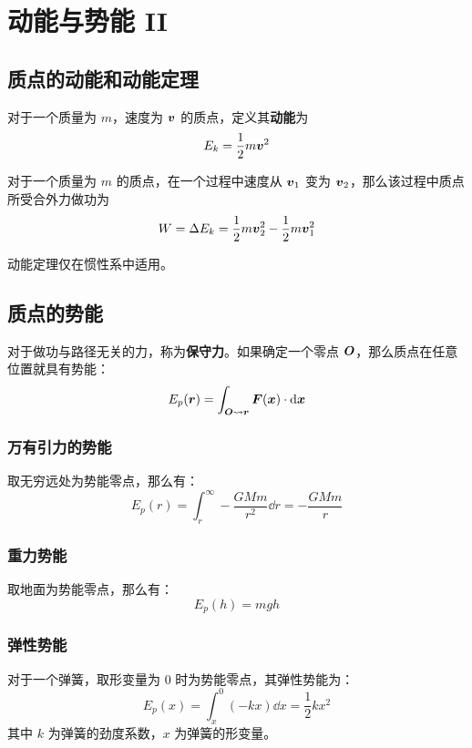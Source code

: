 \section{动能与势能 II}

\subsection{质点的动能和动能定理}

\begin{definition}[质点的动能]
    对于一个质量为 $m$，速度为 $\boldsymbol{v}$ 的质点，定义其\textbf{动能}为
    $$
    E_k = \frac{1}{2} m \boldsymbol{v}^2
    $$
\end{definition}

\begin{theorem}[质点的动能定理]
    对于一个质量为 $m$ 的质点，在一个过程中速度从 $\boldsymbol{v}_1$ 变为 $\boldsymbol{v}_2$，那么该过程中质点所受合外力做功为
    $$
    W = \Delta E_k = \frac{1}{2} m \boldsymbol{v}_2^2 - \frac{1}{2} m \boldsymbol{v}_1^2
    $$
\end{theorem}

动能定理仅在惯性系中适用。

\subsection{质点的势能}

对于做功与路径无关的力，称为\textbf{保守力}。如果确定一个零点 $\boldsymbol{O}$，那么质点在任意位置就具有势能：
$$
E_p(\boldsymbol{r}) = \int_{\boldsymbol{O} \leadsto \boldsymbol{r}} \boldsymbol{F}(\boldsymbol{x}) \cdot \dd{\boldsymbol{x}}
$$


\subsubsection{万有引力的势能}

取无穷远处为势能零点，那么有：
$$
E_p(r) = \int_r^{\infty} - \frac{G M m}{r^2} \dd{r} = - \frac{G M m}{r}
$$

\subsubsection{重力势能}

取地面为势能零点，那么有：
$$
E_p(h) = mgh
$$

\subsubsection{弹性势能}

对于一个弹簧，取形变量为 $0$ 时为势能零点，其弹性势能为：
$$
E_p(x) = \int_x^0 (-kx) \dd{x} = \frac{1}{2} k x^2
$$
其中 $k$ 为弹簧的劲度系数，$x$ 为弹簧的形变量。